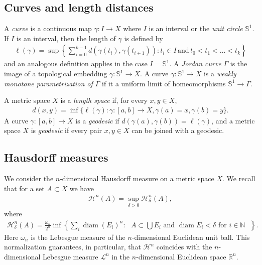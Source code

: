 \documentclass[a4paper,leqno]{amsart}
\numberwithin{equation}{section}
\theoremstyle{remark}
\theoremstyle{remark}
\newcommand{\N}{\mathbb{N}}
\newcommand{\lm}{\mathscr{L}}
\DeclareMathOperator{\diam}{diam}
\begin{document}
\subsection{Curves and length distances}
A \emph{curve} is a continuous map $\gamma \colon I \rightarrow X$ where $I$ is an interval or the \emph{unit circle} $\mathbb{S}^1$. If $I$ is an interval, then the length of $\gamma$ is defined by
\begin{align*}
    \ell( \gamma )
    =
    \sup\left\{
        \sum_{i=0}^{k-1} d( \gamma(t_i), \gamma(t_{i+1}) )
        \colon t_i \in I
        \,\text{and}\,
        t_0 < t_1 < \dots < t_k
    \right\}
\end{align*}
and an analogous definition applies in the case $I = \mathbb{S}^1$. A \emph{Jordan curve} $\Gamma$ is the image of a topological embedding $\gamma \colon \mathbb{S}^1 \rightarrow X$. A curve $\gamma \colon \mathbb{S}^1 \rightarrow X$ is a \emph{weakly monotone parametrization of $\Gamma$} if it a uniform limit of homeomorphisms $\mathbb{S}^1 \rightarrow \Gamma$. 

A metric space $X$ is a \emph{length space} if, for every $x, y \in X$,
\begin{align*}
    d(x,y) = \inf\{ \ell(\gamma) \colon \gamma \colon [a,b] \to X, \gamma(a) = x, \gamma(b) = y \}.
\end{align*}
A curve $\gamma \colon [a,b] \to X$ is a \emph{geodesic} if $d( \gamma(a), \gamma(b) ) = \ell( \gamma )$, and a metric space $X$ is \emph{geodesic} if every pair $x, y \in X$ can be joined with a geodesic.


\subsection{Hausdorff measures}
We consider the $n$-dimensional Hausdorff measure on a metric space $X$. We recall that for a set $A \subset X$ we have
\begin{align*}
    \mathcal{H}^{n}( A ) = \sup_{ \delta > 0 } \mathcal{H}^{n}_{\delta}(A),
\end{align*}
where
\begin{align*}
    \mathcal{H}^{n}_{\delta}(A)
    =
    \frac{ \omega_n }{ 2^n }
    \inf\left\{
        \sum_{ i } \diam(E_i)^{n}
        \colon
        \text{ $A \subset \bigcup E_i$ and $\diam E_i < \delta$ for $i \in \N$ }
    \right\}.
\end{align*}
Here $\omega_n$ is the Lebesgue measure of the $n$-dimensional Euclidean unit ball. This normalization guarantees, in particular, that $\mathcal{H}^n$ coincides with the $n$-dimensional Lebesgue measure $\lm^{n}$ in the $n$-dimensional Euclidean space $\mathbb{R}^n$.
\end{document}
